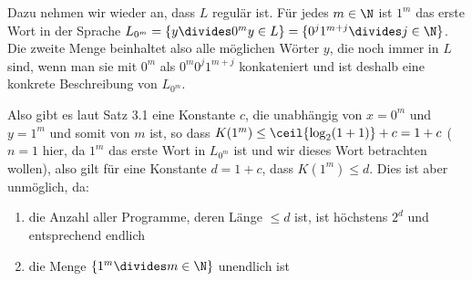 Dazu nehmen wir wieder an, dass $L$ regulär ist. Für jedes $m \in \N$ ist $1^m$ das erste Wort in der Sprache $L_{0^m} = \{ y \divides 0^m y \in L \} = \{ 0^j 1^{m + j} \divides j \in \N \}$.
Die zweite Menge beinhaltet also alle möglichen Wörter $y$, die noch immer in $L$ sind, wenn man sie mit $0^m$ als $0^m 0^j 1^{m + j}$ konkateniert
und ist deshalb eine konkrete Beschreibung von $L_{0^m}$.

Also gibt es laut Satz 3.1 eine Konstante $c$, die unabhängig von $x = 0^m$ und $y = 1^m$ und somit von $m$ ist, so dass $K(1^m) \leq \ceil{\log_2(1 + 1)} + c = 1 + c$
($n = 1$ hier, da $1^m$ das erste Wort in $L_{0^m}$ ist und wir dieses Wort betrachten wollen),
also gilt für eine Konstante $d = 1 + c$, dass $K(1^m) \leq d$.
Dies ist aber unmöglich, da:
\begin{enumerate}[label=(\roman*)]
    \item die Anzahl aller Programme, deren Länge $\leq d$ ist, ist höchstens $2^d$ und entsprechend endlich
    \item die Menge $\{ 1^m \divides m \in \N \}$ unendlich ist
\end{enumerate}

\numberingOn
